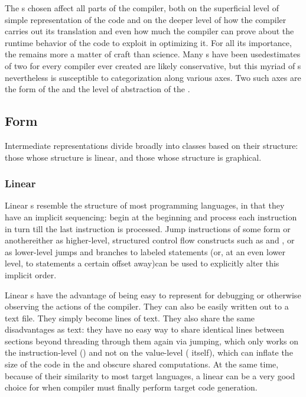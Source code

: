 The s chosen affect all parts of the compiler, both on the superficial level of simple representation of the code and on the deeper level of how the compiler carries out its translation and even how much the compiler can prove about the runtime behavior of the code to exploit in optimizing it. For all its importance, the  remains more a matter of craft than science. Many s have been used\empause estimates of two for every compiler ever created are likely conservative\empause , but this myriad of s nevertheless is susceptible to categorization along various axes. Two such axes are the form of the  and the level of abstraction of the .

\subsection{Form}
Intermediate representations divide broadly into classes based on their structure: those whose structure is linear, and those whose structure is graphical.

\subsubsection{Linear}
Linear s resemble the structure of most programming languages, in that they have an implicit sequencing: begin at the beginning and process each instruction in turn till the last instruction is processed. Jump instructions of some form or another\empause either as higher-level, structured control flow constructs such as  and , or as lower-level jumps and branches to labeled statements (or, at an even lower level, to statements a certain offset away)\empause can be used to explicitly alter this implicit order.

Linear s have the advantage of being easy to represent for debugging or otherwise observing the actions of the compiler. They can also be easily written out to a text file. They simply become lines of text. They also share the same disadvantages as text: they have no easy way to share identical lines between sections beyond threading through them again via jumping, which only works on the instruction-level () and not on the value-level ( itself), which can inflate the size of the code in the  and obscure shared computations. At the same time, because of their similarity to most target languages, a linear  can be a very good choice for when compiler must finally perform target code generation.

